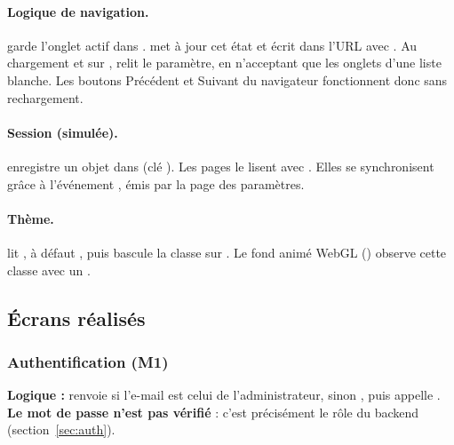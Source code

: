 \paragraph{Logique de navigation.}  garde l'onglet actif dans .  met à jour cet état et écrit  dans l'URL avec . Au chargement et sur ,  relit le paramètre, en n'acceptant que les onglets d'une liste blanche. Les boutons Précédent et Suivant du navigateur fonctionnent donc sans rechargement.

\paragraph{Session (simulée).}  enregistre un objet  dans  (clé ). Les pages le lisent avec . Elles se synchronisent grâce à l'événement , émis par la page des paramètres.

\paragraph{Thème.}  lit , à défaut , puis bascule la classe  sur . Le fond animé WebGL () observe cette classe avec un .

\subsection{Écrans réalisés}

\subsubsection{Authentification (M1)}

\textbf{Logique :}  renvoie  si l'e-mail est celui de l'administrateur, sinon , puis appelle . \textbf{Le mot de passe n'est pas vérifié} : c'est précisément le rôle du backend (section~\ref{sec:auth}).

